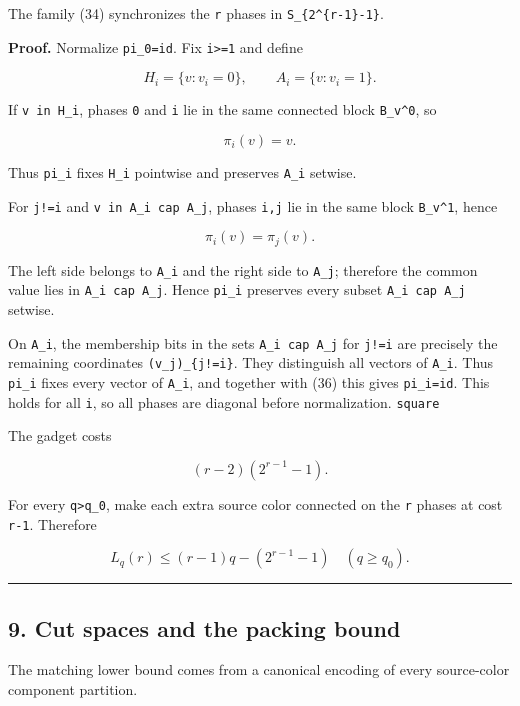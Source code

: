 The family (34) synchronizes the \texttt{r} phases in
\texttt{S\_\{2\^{}\{r-1\}-1\}}.

\textbf{Proof.} Normalize \texttt{pi\_0=id}. Fix
\texttt{i\textgreater{}=1} and define

\[
H_i=\{v:v_i=0\},
\qquad
A_i=\{v:v_i=1\}.
\tag{35}
\]

If \texttt{v\ in\ H\_i}, phases \texttt{0} and \texttt{i} lie in the
same connected block \texttt{B\_v\^{}0}, so

\[
\pi_i(v)=v.
\tag{36}
\]

Thus \texttt{pi\_i} fixes \texttt{H\_i} pointwise and preserves
\texttt{A\_i} setwise.

For \texttt{j!=i} and \texttt{v\ in\ A\_i\ cap\ A\_j}, phases
\texttt{i,j} lie in the same block \texttt{B\_v\^{}1}, hence

\[
\pi_i(v)=\pi_j(v).
\tag{37}
\]

The left side belongs to \texttt{A\_i} and the right side to
\texttt{A\_j}; therefore the common value lies in
\texttt{A\_i\ cap\ A\_j}. Hence \texttt{pi\_i} preserves every subset
\texttt{A\_i\ cap\ A\_j} setwise.

On \texttt{A\_i}, the membership bits in the sets
\texttt{A\_i\ cap\ A\_j} for \texttt{j!=i} are precisely the remaining
coordinates \texttt{(v\_j)\_\{j!=i\}}. They distinguish all vectors of
\texttt{A\_i}. Thus \texttt{pi\_i} fixes every vector of \texttt{A\_i},
and together with (36) this gives \texttt{pi\_i=id}. This holds for all
\texttt{i}, so all phases are diagonal before normalization.
\texttt{square}

The gadget costs

\[
(r-2)(2^{r-1}-1).
\tag{38}
\]

For every \texttt{q\textgreater{}q\_0}, make each extra source color
connected on the \texttt{r} phases at cost \texttt{r-1}. Therefore

\[
L_q(r)\le(r-1)q-(2^{r-1}-1)
\quad(q\ge q_0).
\tag{39}
\]

\begin{center}\rule{0.5\linewidth}{0.5pt}\end{center}

\hypertarget{cut-spaces-and-the-packing-bound}{%
\subsection{9. Cut spaces and the packing
bound}\label{cut-spaces-and-the-packing-bound}}

The matching lower bound comes from a canonical encoding of every
source-color component partition.

